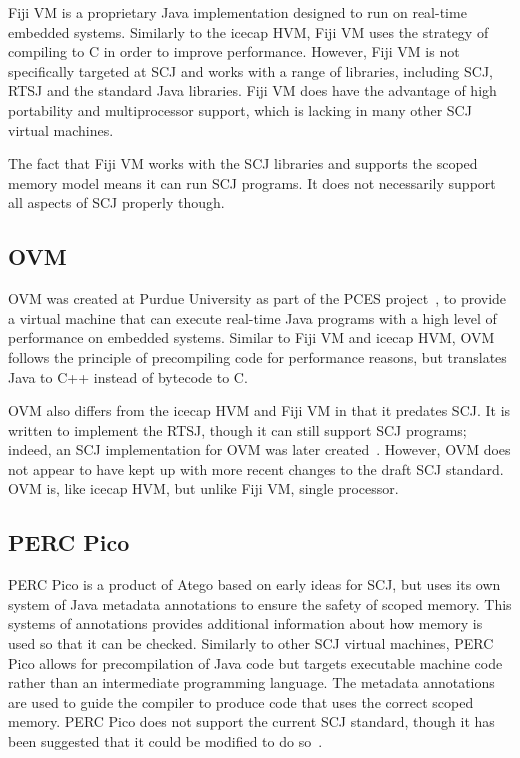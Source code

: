 \documentclass[a4paper,10pt]{report}
\begin{document}
Fiji VM is a proprietary Java implementation designed to run on
real-time embedded systems.
Similarly to the icecap HVM, Fiji VM uses the strategy of compiling to
C in order to improve performance.
However, Fiji VM is not specifically targeted at SCJ and works with a
range of libraries, including SCJ, RTSJ and the standard Java
libraries.
Fiji VM does have the advantage of high portability and multiprocessor
support, which is lacking in many other SCJ virtual machines.

The fact that Fiji VM works with the SCJ libraries and supports the
scoped memory model means it can run SCJ programs.
It does not necessarily support all aspects of SCJ properly though.

\subsection{OVM}

OVM was created at Purdue University as part of the PCES
project~\cite{baker2006}, to provide a virtual machine that can
execute real-time Java programs with a high level of performance on
embedded systems.
Similar to Fiji VM and icecap HVM, OVM follows the principle of
precompiling code for performance reasons, but translates Java to C++
instead of bytecode to C.

OVM also differs from the icecap HVM and Fiji VM in that it predates
SCJ.
It is written to implement the RTSJ, though it can still support SCJ
programs; indeed, an SCJ implementation for OVM was later
created~\cite{plsek2010}.
However, OVM does not appear to have kept up with more recent changes
to the draft SCJ standard.
OVM is, like icecap HVM, but unlike Fiji VM, single processor.

\subsection{PERC Pico}

PERC Pico is a product of Atego based on early ideas for SCJ, but uses
its own system of Java metadata annotations to ensure the safety of
scoped memory.
This systems of annotations provides additional information about how
memory is used so that it can be checked.
Similarly to other SCJ virtual machines, PERC Pico allows for
precompilation of Java code but targets executable machine code rather
than an intermediate programming language.
The metadata annotations are used to guide the compiler to produce
code that uses the correct scoped memory.
PERC Pico does not support the current SCJ standard, though it has
been suggested that it could be modified to do so~\cite{nilsen2011}.
\end{document}
